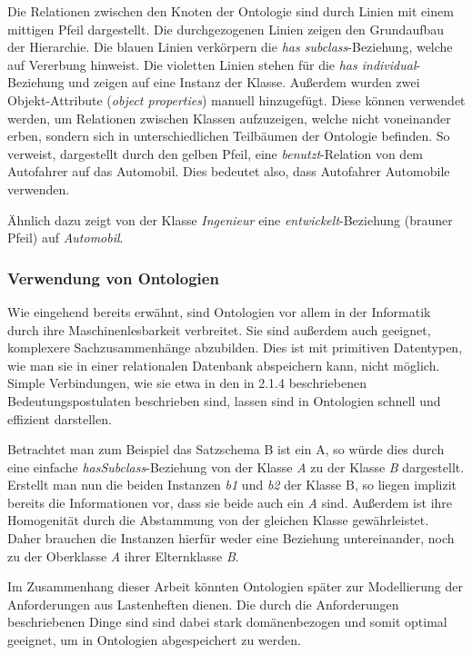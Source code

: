 \documentclass[12pt]{report}
\begin{document}
Die Relationen zwischen den Knoten der Ontologie sind durch Linien mit einem mittigen Pfeil dargestellt. Die durchgezogenen Linien zeigen den Grundaufbau der Hierarchie. Die blauen Linien verkörpern die \textit{has subclass}-Beziehung, welche auf Vererbung hinweist. Die violetten Linien stehen für die \textit{has individual}-Beziehung und zeigen auf eine Instanz der Klasse. 
Außerdem wurden zwei Objekt-Attribute (\textit{object properties}) manuell hinzugefügt. Diese können verwendet werden, um Relationen zwischen Klassen aufzuzeigen, welche nicht voneinander erben, sondern sich in unterschiedlichen \glqq Teilbäumen\grqq{} der Ontologie befinden. So verweist, dargestellt durch den gelben Pfeil, eine \textit{benutzt}-Relation von dem Autofahrer auf das Automobil. Dies bedeutet also, dass Autofahrer Automobile verwenden.  

Ähnlich dazu zeigt von der Klasse \textit{Ingenieur} eine \textit{entwickelt}-Beziehung (brauner Pfeil) auf \textit{Automobil}.

\subsubsection{Verwendung von Ontologien}
Wie eingehend bereits erwähnt, sind Ontologien vor allem in der Informatik durch ihre Maschinenlesbarkeit verbreitet. Sie sind außerdem auch geeignet, komplexere Sachzusammenhänge abzubilden. Dies ist mit primitiven Datentypen, wie man sie in einer relationalen Datenbank abspeichern kann, nicht möglich. Simple Verbindungen, wie sie etwa in den in 2.1.4 beschriebenen Bedeutungspostulaten beschrieben sind, lassen sind in Ontologien schnell und effizient darstellen.

Betrachtet man zum Beispiel das Satzschema \glqq B ist ein A\grqq{}, so würde dies durch eine einfache \textit{hasSubclass}-Beziehung von der Klasse \textit{A} zu der Klasse \textit{B} dargestellt.
Erstellt man nun die beiden Instanzen \textit{b1} und \textit{b2} der Klasse B, so liegen implizit bereits die Informationen vor, dass sie beide auch ein \textit{A} sind. Außerdem ist ihre Homogenität durch die Abstammung von der gleichen Klasse gewährleistet. Daher brauchen die Instanzen hierfür weder eine Beziehung untereinander, noch zu der Oberklasse \textit{A} ihrer Elternklasse \textit{B}.


Im Zusammenhang dieser Arbeit könnten Ontologien später zur Modellierung der Anforderungen aus Lastenheften dienen. Die durch die Anforderungen beschriebenen Dinge sind sind dabei stark domänenbezogen und somit optimal geeignet, um in Ontologien abgespeichert zu werden. 
\end{document}
